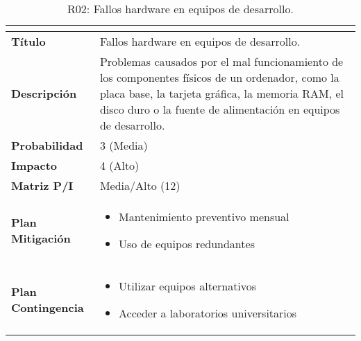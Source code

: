 \begin{table}[H]
\centering
\begin{tabular}{|>{\bfseries}l|p{10cm}|}
\hline
\rowcolor{lightgray}
\multicolumn{2}{|c|}{\textbf{Riesgo R02}} \\ \hline
Título & Fallos hardware en equipos de desarrollo. \\ \hline
Descripción & Problemas causados por el mal funcionamiento de los componentes físicos de un ordenador, como la placa base, la tarjeta gráfica, la memoria RAM, el disco duro o la fuente de alimentación en equipos de desarrollo. \\ \hline
Probabilidad & 3 (Media) \\ \hline
Impacto & 4 (Alto) \\ \hline
Matriz P/I & Media/Alto (12)\\ \hline
Plan Mitigación & 
\begin{itemize}
\item Mantenimiento preventivo mensual
\item Uso de equipos redundantes
\end{itemize} \\ \hline
Plan Contingencia & 
\begin{itemize}
\item Utilizar equipos alternativos
\item Acceder a laboratorios universitarios
\end{itemize} \\ \hline
\end{tabular}
\caption{R02: Fallos hardware en equipos de desarrollo.}
\label{tab:R02}
\end{table}

